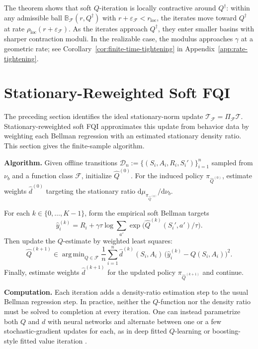 \documentclass{article}
\DeclareMathOperator*{\argmin}{arg\,min}
\theoremstyle{plain}
\theoremstyle{definition}
\theoremstyle{remark}
\begin{document}
The theorem shows that soft \(Q\)-iteration is locally contractive around
\(Q^\dagger\): within any admissible ball
\(\mathbb B_{\mathcal F}(r,Q^\dagger)\) with
\(r+\varepsilon_{\mathcal F}<r_{\mathrm{loc}}\), the
iterates move toward \(Q^\dagger\) at rate
\(\rho_{\mathrm{loc}}(r+\varepsilon_{\mathcal F})\). As the iterates approach \(Q^\dagger\),
they enter smaller basins with sharper contraction moduli. In the realizable
case, the modulus approaches \(\gamma\) at a geometric rate; see
Corollary~\ref{cor:finite-time-tightening} in Appendix~\ref{app:rate-tightening}.

\section{Stationary-Reweighted Soft FQI}
\label{sec:stationary-reweighted-fqi}
\label{sec::algo}

The preceding section identifies the ideal stationary-norm update
\(\mathcal T_{\mathcal F}=\Pi_{\mathcal F}\mathcal T\). Stationary-reweighted
soft FQI approximates this update from behavior data by weighting each Bellman
regression with an estimated stationary density ratio. This section gives the
finite-sample algorithm.

\textbf{Algorithm.}
Given offline transitions
\(\mathcal D_n := \{(S_i,A_i,R_i,S_i')\}_{i=1}^n\) sampled from \(\nu_b\) and a
function class \(\mathcal F\), initialize \(\widehat Q^{(0)}\). For the induced
policy \(\pi_{\widehat Q^{(0)}}\), estimate weights \(\widehat d^{(0)}\)
targeting the stationary ratio
\(\mathrm d\mu_{\pi_{\widehat Q^{(0)}}}/\mathrm d\nu_b\).

For each \(k \in \{0,\dots,K-1\}\), form the empirical soft Bellman targets
\[
\widehat y_i^{(k)}
=
R_i
+
\gamma\tau \log \sum_{a'}
\exp\!\bigl(\widehat Q^{(k)}(S_i',a')/\tau\bigr).
\]
Then update the \(Q\)-estimate by weighted least squares:
\[
\widehat Q^{(k+1)}
\in
\argmin_{Q\in\mathcal F}
\frac{1}{n}\sum_{i=1}^n
\widehat d^{(k)}(S_i,A_i)\,
\bigl(\widehat y_i^{(k)}-Q(S_i,A_i)\bigr)^2.
\]
Finally, estimate weights \(\widehat d^{(k+1)}\) for the updated policy
\(\pi_{\widehat Q^{(k+1)}}\) and continue. 


\textbf{Computation.} Each iteration adds a density-ratio estimation step to the usual
Bellman regression step. In practice, neither the \(Q\)-function nor the density
ratio must be solved to completion at every iteration. One can instead
parametrize both \(Q\) and \(d\) with neural networks and alternate between one or
a few stochastic-gradient updates for each, as in deep fitted \(Q\)-learning or
boosting-style fitted value iteration
\citep{riedmiller2005neural,tosatto2017boosted}.
\end{document}
